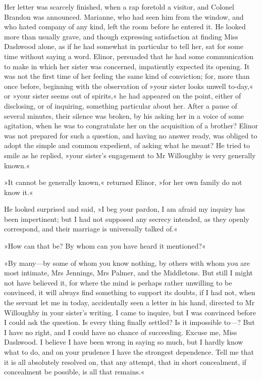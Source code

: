 Her letter was scarcely finished, when a rap foretold a visitor, and Colonel Brandon was announced. Marianne, who had seen him from the window, and who hated company of any kind, left the room before he entered it. He looked more than usually grave, and though expressing satisfaction at finding Miss Dashwood alone, as if he had somewhat in particular to tell her, sat for some time without saying a word. Elinor, persuaded that he had some communication to make in which her sister was concerned, impatiently expected its opening. It was not the first time of her feeling the same kind of conviction; for, more than once before, beginning with the observation of »your sister looks unwell to-day,« or »your sister seems out of spirits,« he had appeared on the point, either of disclosing, or of inquiring, something particular about her. After a pause of several minutes, their silence was broken, by his asking her in a voice of some agitation, when he was to congratulate her on the acquisition of a brother? Elinor was not prepared for such a question, and having no answer ready, was obliged to adopt the simple and common expedient, of asking what he meant? He tried to smile as he replied, »your sister’s engagement to Mr Willoughby is very generally known.«

»It cannot be generally known,« returned Elinor, »for her own family do not know it.«

He looked surprised and said, »I beg your pardon, I am afraid my inquiry has been impertinent; but I had not supposed any secrecy intended, as they openly correspond, and their marriage is universally talked of.«

»How can that be? By whom can you have heard it mentioned?«

»By many—by some of whom you know nothing, by others with whom you are most intimate, Mrs Jennings, Mrs Palmer, and the Middletons. But still I might not have believed it, for where the mind is perhaps rather unwilling to be convinced, it will always find something to support its doubts, if I had not, when the servant let me in today, accidentally seen a letter in his hand, directed to Mr Willoughby in your sister’s writing. I came to inquire, but I was convinced before I could ask the question. Is every thing finally settled? Is it impossible to—? But I have no right, and I could have no chance of succeeding. Excuse me, Miss Dashwood. I believe I have been wrong in saying so much, but I hardly know what to do, and on your prudence I have the strongest dependence. Tell me that it is all absolutely resolved on, that any attempt, that in short concealment, if concealment be possible, is all that remains.«


